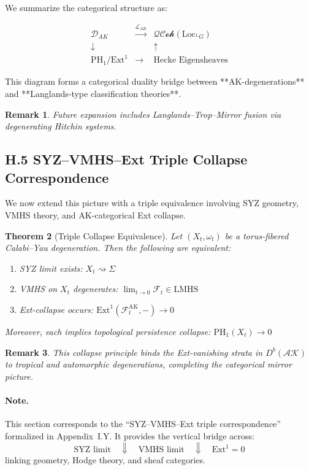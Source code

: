 \documentclass[11pt]{article}
\newtheorem{theorem}{Theorem}[section]
\newtheorem{remark}[theorem]{Remark}
\begin{document}
We summarize the categorical structure as:

\[
\begin{array}{ccc}
\mathcal{D}_{AK} & \xrightarrow{\mathcal{L}_{AK}} & \mathcal{QCoh}(\mathrm{Loc}_{^LG}) \\
\downarrow & & \uparrow \\
\mathrm{PH}_1 / \mathrm{Ext}^1 & \longrightarrow & \text{Hecke Eigensheaves}
\end{array}
\]

This diagram forms a categorical duality bridge  
between **AK-degenerations** and **Langlands-type classification theories**.

\begin{remark}
Future expansion includes Langlands–Trop–Mirror fusion via degenerating Hitchin systems.
\end{remark}


\subsection*{H.5 SYZ–VMHS–Ext Triple Collapse Correspondence}

We now extend this picture with a triple equivalence involving SYZ geometry, VMHS theory, and AK-categorical Ext collapse.

\begin{theorem}[Triple Collapse Equivalence]
Let $(X_t, \omega_t)$ be a torus-fibered Calabi–Yau degeneration. Then the following are equivalent:
\begin{enumerate}
    \item SYZ limit exists: $X_t \rightsquigarrow \Sigma$
    \item VMHS on $X_t$ degenerates: $\lim_{t \to 0} \mathcal{F}_t \in \mathrm{LMHS}$
    \item Ext-collapse occurs: $\mathrm{Ext}^1(\mathcal{F}_t^{\mathrm{AK}}, -) \to 0$
\end{enumerate}
Moreover, each implies topological persistence collapse: $\mathrm{PH}_1(X_t) \to 0$
\end{theorem}

\begin{remark}
This collapse principle binds the Ext-vanishing strata in $D^b(\mathcal{AK})$ to tropical and automorphic degenerations, completing the categorical mirror picture.
\end{remark}

\paragraph{Note.}
This section corresponds to the “SYZ–VMHS–Ext triple correspondence” formalized in Appendix~I.Y. It provides the vertical bridge across:
\[
\text{SYZ limit} \quad \Downarrow \quad \text{VMHS limit} \quad \Downarrow \quad \mathrm{Ext}^1 = 0
\]
linking geometry, Hodge theory, and sheaf categories.
\end{document}
